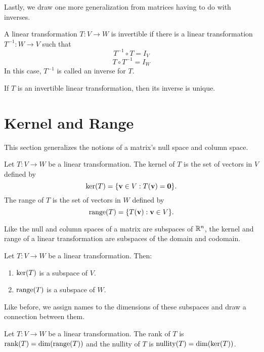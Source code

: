 \documentclass[../m073main.tex]{subfiles}
\begin{document}
Lastly, we draw one more generalization from matrices having to do with inverses.

\begin{definition}
	A linear transformation $T : V \to W$ is invertible if there is a linear transformation $T^{-1} : W \to V$ such that
	\[ T^{-1} \circ T = I_V \]
	\[ T \circ T^{-1} = I_W \]
	In this case, $T^{-1}$ is called an inverse for $T$.
\end{definition}

\begin{theorem}
	If $T$ is an invertible linear transformation, then its inverse is unique.
\end{theorem}

\section{Kernel and Range}
This section generalizes the notions of a matrix's null space and column space.

\begin{definition}
	Let $T : V \to W$ be a linear transformation.
	The kernel of $T$ is the set of vectors in $V$ defined by
	\[ \textrm{ker}(T) = \{\mathbf{v} \in V : T(\mathbf{v}) = \mathbf{0}\}. \]
	The range of $T$ is the set of vectors in $W$ defined by
	\[ \textrm{range}(T) = \{T(\mathbf{v}) : \mathbf{v} \in V\}. \]
\end{definition}

Like the null and column spaces of a matrix are subspaces of $\mathbb{R}^n$, the kernel and range of a linear transformation are subspaces of the domain and codomain.

\begin{theorem}
	Let $T : V \to W$ be a linear transformation.
	Then:
	\begin{enumerate}[label=(\alph*)]
		\item $\textrm{ker}(T)$ is a subspace of $V$.
		\item $\textrm{range}(T)$ is a subspace of $W$.
	\end{enumerate}
\end{theorem}

Like before, we assign names to the dimensions of these subspaces and draw a connection between them.

\begin{definition}
	Let $T : V \to W$ be a linear transformation.
	The rank of $T$ is $\textrm{rank}(T) = \dim (\textrm{range}(T))$ and the nullity of $T$ is $\textrm{nullity}(T) = \dim (\textrm{ker}(T))$.
\end{definition}
\end{document}
